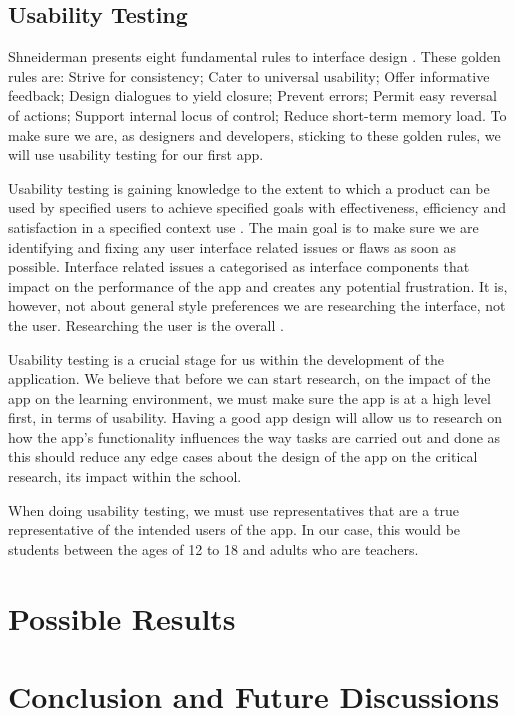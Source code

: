 \documentclass{sigchi}
\begin{document}
\subsection{Usability Testing}
Shneiderman presents eight fundamental rules to interface design \cite{find_sch_ref}. These golden rules are: Strive for consistency; Cater to universal usability; Offer informative feedback; Design dialogues to yield closure; Prevent errors; Permit easy reversal of actions; Support internal locus of control; Reduce short-term memory load. To make sure we are, as designers and developers, sticking to these golden rules, we will use usability testing for our first app.

Usability testing is gaining knowledge to the extent to which a product can be used by specified users to achieve specified goals with effectiveness, efficiency and satisfaction in a specified context use \cite{ISO definition}. The main goal is to make sure we are identifying and fixing any user interface related issues or flaws as soon as possible. Interface related issues a categorised as interface components that impact on the performance of the app and creates any potential frustration. It is, however, not about general style preferences we are researching the interface, not the user. Researching the user is the overall  \cite{suiyan slides usability test}.  

Usability testing is a crucial stage for us within the development of the application. We believe that before we can start research, on the impact of the app on the learning environment, we must make sure the app is at a high level first, in terms of usability. Having a good app design will allow us to research on how the app's functionality influences the way tasks are carried out and done as this should reduce any edge cases about the design of the app on the critical research, its impact within the school. 

When doing usability testing, we must use representatives that are a true representative of the intended users of the app. In our case, this would be students between the ages of 12 to 18 and adults who are teachers. 


\section{Possible Results}



\section{Conclusion and Future Discussions}
\end{document}
